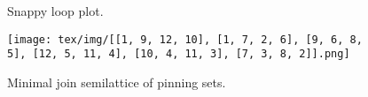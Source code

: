 \documentclass{article}%
\begin{document}
\newpage

\begin{multicols}{2}
\begin{figure}[H]
\centering
\def\svgscale{0.7}

\caption{Snappy loop plot.}
\label{fig:tex/img/[[1, 9, 12, 10], [1, 7, 2, 6], [9, 6, 8, 5], [12, 5, 11, 4], [10, 4, 11, 3], [7, 3, 8, 2]].svg}
\end{figure}
\columnbreak

\begin{figure}[H]
\centering
\texttt{[image: tex/img/[[1, 9, 12, 10], [1, 7, 2, 6], [9, 6, 8, 5], [12, 5, 11, 4], [10, 4, 11, 3], [7, 3, 8, 2]].png]}
\caption{Minimal join semilattice of pinning sets.}
\label{fig:tex/img/[[1, 9, 12, 10], [1, 7, 2, 6], [9, 6, 8, 5], [12, 5, 11, 4], [10, 4, 11, 3], [7, 3, 8, 2]].png}
\end{figure}
\end{multicols}

\newpage
\end{document}
